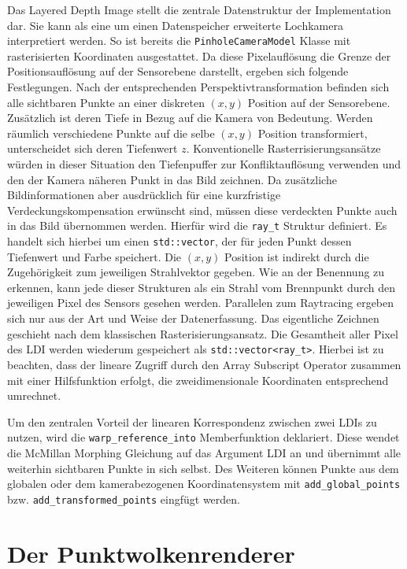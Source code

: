 \documentclass[hyperref, beleg, german]{cgvpub}
\begin{document}
Das Layered Depth Image stellt die zentrale Datenstruktur der Implementation
dar. Sie kann als eine um einen Datenspeicher erweiterte Lochkamera
interpretiert werden. So ist bereits die \texttt{Pinhole\-Camera\-Model} Klasse
mit rasterisierten Koordinaten ausgestattet. Da diese Pixelauflösung die Grenze
der Positionsauflösung auf der Sensorebene darstellt, ergeben sich folgende
Festlegungen. Nach der entsprechenden Perspektivtransformation befinden sich
alle sichtbaren Punkte an einer diskreten \( (x, y) \) Position auf der
Sensorebene. Zusätzlich ist deren Tiefe in Bezug auf die Kamera von Bedeutung.
Werden räumlich verschiedene Punkte auf die selbe \( (x,y) \) Position
transformiert, unterscheidet sich deren Tiefenwert \(z\). Konventionelle
Rasterrisierungsansätze würden in dieser Situation den Tiefenpuffer zur
Konfliktauflösung verwenden und den der Kamera näheren Punkt in das Bild
zeichnen. Da zusätzliche Bildinformationen aber ausdrücklich für eine
kurzfristige Verdeckungskompensation erwünscht sind, müssen diese verdeckten
Punkte auch in das Bild übernommen werden. Hierfür wird die \texttt{ray\_t}
Struktur definiert. Es handelt sich hierbei um einen \texttt{std::vector}, der
für jeden Punkt dessen Tiefenwert und Farbe speichert. Die \( (x,y) \) Position
ist indirekt durch die Zugehörigkeit zum jeweiligen Strahlvektor gegeben. Wie
an der Benennung zu erkennen, kann jede dieser Strukturen als ein Strahl vom
Brennpunkt durch den jeweiligen Pixel des Sensors gesehen werden. Parallelen
zum Raytracing ergeben sich nur aus der Art und Weise der Datenerfassung. Das
eigentliche Zeichnen geschieht nach dem klassischen Rasterisierungsansatz. Die
Gesamtheit aller Pixel des LDI werden wiederum gespeichert als
\texttt{std::vector<ray\_t>}. Hierbei ist zu beachten, dass der lineare Zugriff
durch den Array Subscript Operator zusammen mit einer Hilfsfunktion erfolgt,
die zweidimensionale Koordinaten entsprechend umrechnet.

Um den zentralen Vorteil der linearen Korrespondenz zwischen zwei LDIs zu
nutzen, wird die \texttt{warp\-\_reference\-\_into} Memberfunktion deklariert.
Diese wendet die McMillan Morphing Gleichung auf das Argument LDI an und
übernimmt alle weiterhin sichtbaren Punkte in sich selbst. Des Weiteren können
Punkte aus dem globalen oder dem kamerabezogenen Koordinatensystem mit
\texttt{add\-\_global\-\_points} bzw. \texttt{add\-\_transformed\-\_points}
eingfügt werden.

\section{Der Punktwolkenrenderer}
\end{document}
